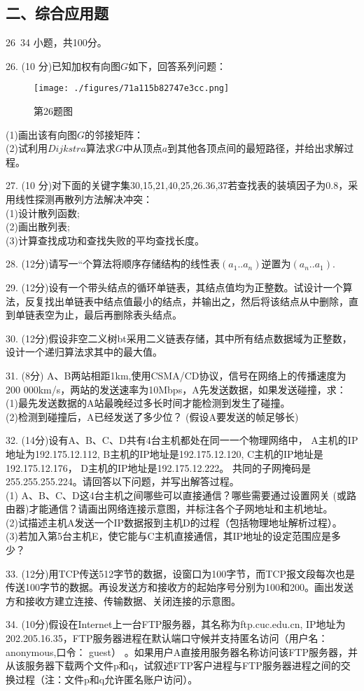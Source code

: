 \subsection{二、综合应用题}
26~34 小题，共100分。

26. (10 分)已知加权有向图$G$如下，回答系列问题： \\
\begin{figure}[ht]
\centering
\texttt{[image: ./figures/71a115b82747e3cc.png]}
\caption{第26题图} \label{fig_DNCC13_1}
\end{figure}
(1)画出该有向图$G$的邻接矩阵： \\
(2)试利用$Dijkstra$算法求$G$中从顶点$a$到其他各顶点间的最短路径，并给出求解过程。

27. (10 分)对下面的关键字集{30,15,21,40,25,26.36,37}若查找表的装填因子为$0.8$，采用线性探测再散列方法解决冲突： \\
(1)设计散列函数; \\
(2)画出散列表; \\
(3)计算查找成功和查找失败的平均查找长度。

28. (12分)请写一“个算法将顺序存储结构的线性表$(a_1..a_n)$逆置为$(a_n..a_1)$.

29. (12分)设有一个带头结点的循环单链表，其结点值均为正整数。试设计一个算法，反复找出单链表中结点值最小的结点，并输出之，然后将该结点从中删除，直到单链表空为止，最后再删除表头结点。

30. (12分)假设非空二义树bt采用二义链表存储，其中所有结点数据域为正整数，设计一个递归算法求其中的最大值。

31. (8分) A、B两站相距1km,使用CSMA/CD协议，信号在网络上的传播速度为200 000km/s，两站的发送速率为10Mbps，A先发送数据，如果发送碰撞，求： \\
(1)最先发送数据的A站最晚经过多长时间才能检测到发生了碰撞。 \\
(2)检测到碰撞后，A已经发送了多少位？ (假设A要发送的帧足够长)

32. (14分)设有A、B、C、D共有4台主机都处在同一一个物理网络中， A主机的IP地址为192.175.12.112, B主机的IP地址是192.175.12.120, C主机的IP地址是192.175.12.176， D主机的IP地址是192.175.12.222。 共同的子网掩码是255.255.255.224。请回答以下问题，并写出解答过程。 \\
(1) A、B、C、D这4台主机之间哪些可以直接通信？哪些需要通过设置网关
(或路由器)才能通信？请画出网络连接示意图，并标注各个子网地址和主机地址。 \\
(2)试描述主机A发送一个IP数据报到主机D的过程（包括物理地址解析过程）。 \\
(3)若加入第5台主机E，使它能与C主机直接通信，其IP地址的设定范围应是多少？

33. (12分)用TCP传送512字节的数据，设窗口为100字节，而TCP报文段每次也是传送100字节的数据。再设发送方和接收方的起始序号分别为100和200。画出发送方和接收方建立连接、传输数据、关闭连接的示意图。

34. (10分)假设在Internet上一台FTP服务器，其名称为ftp.cuc.edu.cn, IP地址为202.205.16.35，FTP服务器进程在默认端口守候并支持匿名访问（用户名：anonymous,口令： guest） 。如果用户A直接用服务器名称访问该FTP服务器，并从该服务器下载两个文件p和q，试叙述FTP客户进程与FTP服务器进程之间的交换过程（注：文件p和q允许匿名账户访问）。
